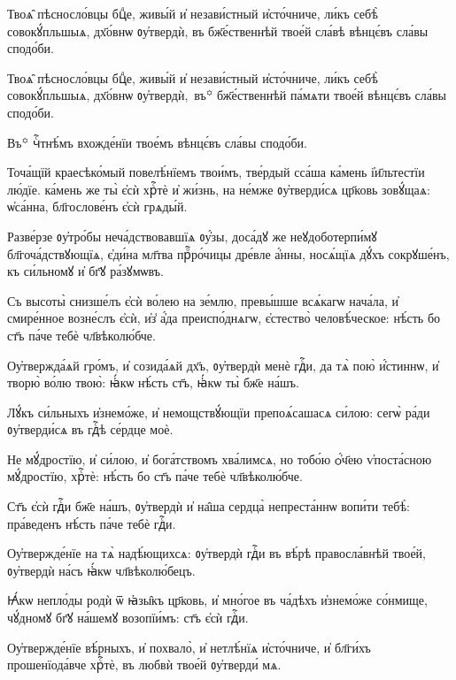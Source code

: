 \hKv Твоѧ̑ пѣсносло́вцы бцⷣе, живы́й и҆  незави́стный и҆сто́чниче, ли́къ себѣ̀ совокꙋ́пльшыѧ,  дх҃о́внѡ ᲂу҆твердѝ, въ бж҃е́ственнѣй твое́й сла́вѣ  вѣнцє́въ сла́вы сподо́би.
% 

\hKv Твоѧ̑ пѣсносло́вцы бцⷣе, живы́й и҆  незави́стный и҆сто́чниче, ли́къ себѣ̀ совокꙋ́пльшыѧ,  дх҃о́внѡ ᲂу҆твердѝ, въ꙳ бж҃е́ственнѣй па́мѧти твое́й  вѣнцє́въ сла́вы сподо́би.
%

\hKv Въ꙳ чⷭ҇тнѣ́мъ  вхожде́нїи твое́мъ вѣнцє́въ сла́вы сподо́би.
%

\hKv Точа́щїй краесѣко́мый повелѣ́нїемъ  твои́мъ, тве́рдый сса́ша ка́мень і҆и҃льтестїи лю́дїе.  ка́мень же ты̀ є҆сѝ хрⷭ҇тѐ и҆ жи́знь, на не́мже  ᲂу҆тверди́сѧ цр҃ковь зовꙋ́щаѧ: ѡ҆са́нна, бл҃гослове́нъ  є҆сѝ грѧды́й. 
%

\hKv Разве́рзе ᲂу҆тро́бы неча́дствовавшїѧ  ᲂу҆́зы, доса́дꙋ же неꙋдоботерпи́мꙋ бл҃гоча́дствꙋющїѧ,  є҆ди́на мл҃тва прⷪ҇ро́чицы дре́вле а҆́нны, носѧ́щїѧ дꙋ́хъ  сокрꙋше́нъ, къ си́льномꙋ и҆ бг҃ꙋ ра́зꙋмѡвъ. 
%

\hKv Съ высоты̀ снизше́лъ є҆сѝ во́лею на зе́млю, превы́шше  всѧ́кагѡ нача́ла, и҆ смире́нное возне́слъ є҆сѝ, и҆з̾  а҆́да преиспо́днѧгѡ, є҆стество̀ человѣ́ческое: нѣ́сть бо  ст҃ъ па́че тебѐ чл҃вѣколю́бче. 

\hKv Оу҆твержда́ѧй гро́мъ, и҆ созида́ѧй дх҃ъ, ᲂу҆твердѝ менѐ  гдⷭ҇и, да тѧ̀ пою̀ и҆́стиннѡ, и҆ творю̀ во́лю твою̀: ꙗ҆́кѡ  нѣ́сть ст҃ъ, ꙗ҆́кѡ ты̀ бж҃е на́шъ.  
%

\hKv Лꙋ́къ си́льныхъ и҆знемо́же, и҆  немощствꙋ́ющїи препоѧ́сашасѧ си́лою: сегѡ̀ ра́ди  ᲂу҆тверди́сѧ въ гдⷭ҇ѣ се́рдце моѐ. 

\hKv Не мꙋ́дростїю, и҆ си́лою, и҆ бога́тствомъ хва́лимсѧ, но  тобо́ю ѻ҆́ч҃ею ѵ҆поста́сною мꙋ́дростїю, хрⷭ҇тѐ: нѣ́сть бо  ст҃ъ па́че тебѐ чл҃вѣколю́бче. 

\hKv Ст҃ъ є҆сѝ гдⷭ҇и бж҃е на́шъ, ᲂу҆твердѝ и҆ на̑ша сердца̀  непреста́ннѡ вопи́ти тебѣ̀: пра́веденъ нѣ́сть па́че тебѐ  гдⷭ҇и. 

\hKv Оу҆твержде́нїе на тѧ̀ надѣ́ющихсѧ: ᲂу҆твердѝ гдⷭ҇и въ  вѣ́рѣ правосла́внѣй твое́й, ᲂу҆твердѝ на́съ ꙗ҆́кѡ  чл҃вѣколю́бецъ. 

\hKv Ꙗ҆́кѡ непло́ды родѝ ѿ ꙗ҆зы̑къ цр҃ковь, и҆ мно́гое въ  ча́дѣхъ и҆знемо́же со́нмище, чꙋ́дномꙋ бг҃ꙋ на́шемꙋ  возопїи́мъ: ст҃ъ є҆сѝ гдⷭ҇и.  

\hKv Оу҆твержде́нїе вѣ́рныхъ, и҆ похвало̀, и҆ нетлѣ́нїѧ  и҆сто́чниче, и҆ бл҃ги́хъ прошенїода́вче хрⷭ҇тѐ, въ любвѝ  твое́й ᲂу҆тверди́ мѧ.  

